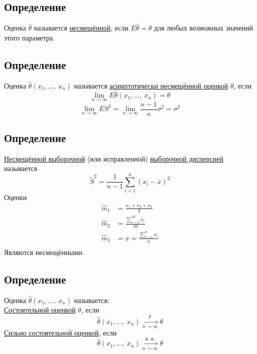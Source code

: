 \documentclass[12pt, a4paper]{article}
\newcommand{\sion}{\sum\limits_{i = 1}^{n}}
\begin{document}
\subsection*{Определение}
Оценка $\hat{\theta}$ называется \underline{несмещённой}, если $E\hat{\theta} = \theta$ для любых возможных значений этого параметра.
\subsection*{Определение}
Оценка $\hat{\theta}(x_1,\dots,\ x_n)$ называется \underline{асимптотически несмещённой оценкой} $\theta$, если
\[\lim_{n\to\infty} E\hat{\theta}(x_1,\dots,\ x_n) = \theta\]
\[\lim_{n\to\infty} ES^2 = \lim_{n\to\infty} \frac{n - 1}{n}\sigma^2 = \sigma^2\]
\subsection*{Определение}
\underline{Несмещённой выборочной} (или исправленной) \underline{выборочной дисперсией} называется
\[\tilde{S}^2 = \frac{1}{n - 1} \sum_{i = 1}^{n} {(x_i - \overline{x})}^2\]
Оценки
\[\begin{aligned}
    \hat{m}_1 &= \frac{x_1 + x_2 + x_3}{3}\\
    \hat{m}_2 &= \frac{\sum_{i = 1}^{10} x_i}{10}\\
    \hat{m}_3 &= \overline{x} = \frac{\sion x_i}{n}\\  
\end{aligned}\]
Являются несмещёнными.
\subsection*{Определение}
Оценка $\hat{\theta}(x_1,\dots,\ x_n)$ называется:\\
\underline{Состоятельной оценкой} $\theta$, если
\[\hat{\theta} (x_1,\dots,\ x_n) \xrightarrow[n\to\infty]{p} \theta\]
\underline{Сильно состоятельной оценкой}, если
\[\hat{\theta} (x_1,\dots,\ x_n) \xrightarrow[n\to\infty]{\text{п. н.}} \theta\]
\end{document}
